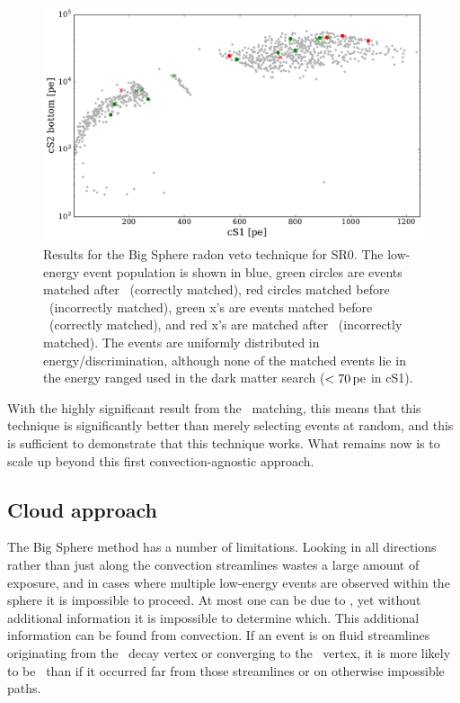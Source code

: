 \begin{figure}[htbp]
\centering
    \includegraphics[width=\textwidth]{figures/rnveto/sr0_bs_results_energy}
    \caption{Results for the Big Sphere radon veto technique for SR0. The low-energy event population is shown in blue, green circles are events matched after \Po~(correctly matched), red circles matched before \Po~(incorrectly matched), green x's are events matched before \BiPo~(correctly matched), and red x's are matched after \BiPo~(incorrectly matched). The events are uniformly distributed in energy/discrimination, although none of the matched events lie in the energy ranged used in the dark matter search ($<70\,\mathrm{pe}$ in cS1).}\label{fig:match_parameters1}
\end{figure}

With the highly significant result from the \Po~matching, this means that this technique is significantly better than merely selecting events at random, and this is sufficient to demonstrate that this technique works. What remains now is to scale up beyond this first convection-agnostic approach.

\subsection{Cloud approach}

The Big Sphere method has a number of limitations. Looking in all directions rather than just along the convection streamlines wastes a large amount of exposure, and in cases where multiple low-energy events are observed within the sphere it is impossible to proceed. At most one can be due to \Pb, yet without additional information it is impossible to determine which. This additional information can be found from convection. If an event is on fluid streamlines originating from the \Po~decay vertex or converging to the \BiPo~vertex, it is more likely to be \Pb~than if it occurred far from those streamlines or on otherwise impossible paths.

